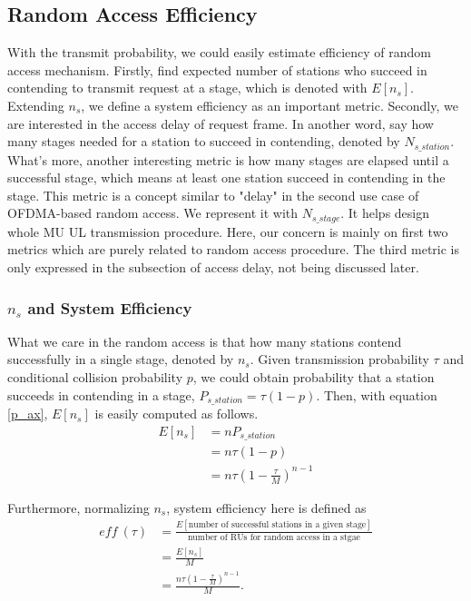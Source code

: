 \documentclass[journal]{IEEEtran}
\begin{document}
\subsection{Random Access Efficiency}
With the transmit probability, we could easily estimate efficiency of random access mechanism. 
Firstly, find expected number of stations who succeed in contending to transmit request at a stage, which is denoted with $E[n_s]$. 
Extending $n_s$, we define a system efficiency as an important metric.
Secondly, we are interested in the access delay of request frame. 
In another word, say how many stages needed for a station to succeed in contending, denoted by $N_{s\_station}$.
What's more, another interesting metric is how many stages are elapsed until a successful stage, which means at least one station succeed in contending in the stage. This metric is a concept similar to "delay" in the second use case of OFDMA-based random access. We represent it with $N_{s\_stage}$. It helps design whole MU UL transmission procedure. 
Here, our concern is mainly on first two metrics which are purely related to random access procedure. The third metric is only expressed in the subsection of access delay, not being discussed later. 

\subsubsection{$n_s$ and System Efficiency}
What we care in the random access is that how many stations contend successfully in a single stage, denoted by $n_s$.
Given transmission probability $\tau$ and conditional collision probability $p$, we could obtain probability that a station succeeds in contending in a stage, $P_{s\_station} = \tau (1-p)$.
Then, with equation \ref{p_ax}, $E[n_s]$ is easily computed as follows. 
\begin{align}
\label{equ_ns}
E[n_s] &= n P_{s\_station} \nonumber \\
		&= n\tau (1-p) \nonumber \\
		&= n\tau (1-\frac{\tau}{M})^{n-1}
\end{align}

Furthermore, normalizing $n_s$, system efficiency here is defined as 
\begin{align}
\label{eff_def}
\textit{eff}\ (\tau) &= \frac{E[\text{number of successful stations in a given stage}]}{\text{number of RUs for random access in a stgae}} \nonumber\\
					 &=\frac{E[n_s]}{M} \nonumber \\
					 &= \frac{n\tau(1-\frac{\tau}{M})^{n-1}}{M}.
\end{align}
\end{document}
